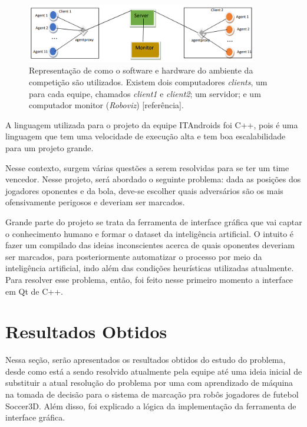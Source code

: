 \documentclass[a4paper,12pt]{article}
\begin{document}
\begin{figure}[H]
	\centering
	\includegraphics[width=0.9\textwidth]{figures/computers-schema.png}
   \caption{Representação de como o software e hardware do ambiente da competição são utilizados. Existem dois computadores \textit{clients}, um para cada equipe, chamados \textit{client1} e \textit{client2}; um servidor; e um computador monitor (\textit{Roboviz}) [referência].} \label{fig:computers-schema}
\end{figure}

A linguagem utilizada para o projeto da equipe ITAndroids foi C++, pois é uma linguagem que tem uma velocidade de execução alta e tem boa escalabilidade para um projeto grande.

Nesse contexto, surgem várias questões a serem resolvidas para se ter um time vencedor. Nesse projeto, será abordado o seguinte problema: dada as posições dos jogadores oponentes e da bola, deve-se escolher quais adversários são os mais ofensivamente perigosos e deveriam ser marcados.

Grande parte do projeto se trata da ferramenta de interface gráfica que vai captar o conhecimento humano e formar o dataset da inteligência artificial. O intuito é fazer um compilado das ideias inconscientes acerca de quais oponentes deveriam ser marcados, para posteriormente automatizar o processo por meio da inteligência artificial, indo além das condições heurísticas utilizadas atualmente. Para resolver esse problema, então, foi feito nesse primeiro momento a interface em Qt de C++.

\section{Resultados Obtidos}

Nessa seção, serão apresentados os resultados obtidos do estudo do problema, desde como está a sendo resolvido atualmente pela equipe até uma ideia inicial de substituir a atual resolução do problema por uma com aprendizado de máquina na tomada de decisão para o sistema de marcação pra robôs jogadores de futebol Soccer3D. Além disso, foi explicado a lógica da implementação da ferramenta de interface gráfica.
\end{document}
